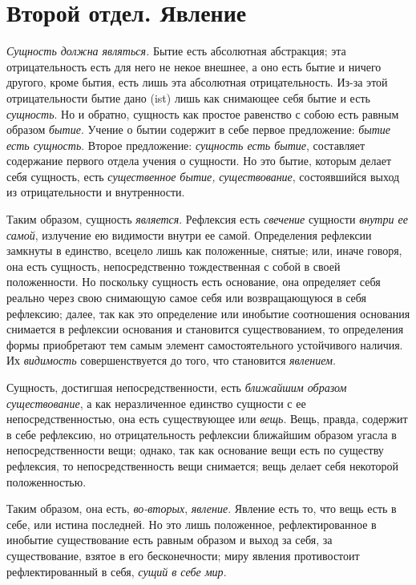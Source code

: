\clearpage
\part[{\em Второй отдел} Явление]{Второй отдел. Явление}

{\em Сущность должна являться.}
Бытие есть абсолютная абстракция; эта отрицательность есть для него не некое
внешнее, а оно есть бытие и ничего другого, кроме бытия, есть лишь эта
абсолютная отрицательность. Из-за этой отрицательности бытие дано (ist)
лишь как снимающее себя бытие и есть {\em сущность}. Но
и обратно, сущность как простое равенство с собою есть равным образом
{\em бытие}. Учение о бытии содержит в себе первое
предложение: {\em бытие есть сущность}. Второе
предложение: {\em сущность есть бытие}, составляет
содержание первого отдела учения о сущности. Но это бытие, которым делает
себя сущность, есть {\em существенное бытие,}
{\em существование}, состоявшийся выход из
отрицательности и внутренности.

Таким образом, сущность {\em является}. Рефлексия есть
{\em свечение} сущности {\em внутри
ее самой}, излучение ею видимости внутри ее самой. Определения рефлексии
замкнуты в единство, всецело лишь как положенные, снятые; или, иначе
говоря, она есть сущность, непосредственно тождественная с собой в своей
положенности. Но поскольку сущность есть основание, она определяет себя
реально через свою снимающую самое себя или возвращающуюся в себя
рефлексию; далее, так как это определение или инобытие соотношения
основания снимается в рефлексии основания и становится существованием, то
определения формы приобретают тем самым элемент самостоятельного
устойчивого наличия. Их {\em видимость}
совершенствуется до того, что становится {\em явлением}.

Сущность, достигшая непосредственности, есть
{\em ближайшим образом существование}, а как
неразличенное единство сущности с ее непосредственностью, она есть
существующее или {\em вещь}. Вещь, правда, содержит в
себе рефлексию, но отрицательность рефлексии ближайшим образом угасла в
непосредственности вещи; однако, так как основание вещи есть по существу
рефлексия, то непосредственность вещи снимается; вещь делает себя некоторой
положенностью.

Таким образом, она есть, {\em во-вторых},
{\em явление}. Явление есть то, что вещь есть в себе,
или истина последней. Но это лишь положенное, рефлектированное в инобытие
существование есть равным образом и выход за себя, за существование, взятое
в его бесконечности; миру явления противостоит рефлектированный в себя,
{\em сущий в себе мир}.

